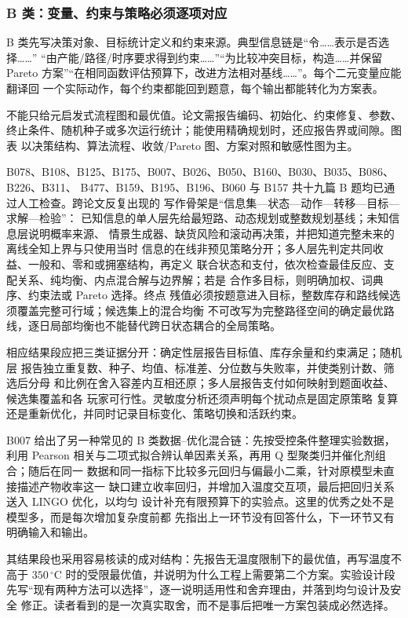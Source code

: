 \subsubsection{B 类：变量、约束与策略必须逐项对应}

B 类先写决策对象、目标统计定义和约束来源。典型信息链是“令……表示是否选择……”
“由产能/路径/时序要求得到约束……”“为比较冲突目标，构造……并保留 Pareto
方案”“在相同函数评估预算下，改进方法相对基线……”。每个二元变量应能翻译回
一个实际动作，每个约束都能回到题意，每个输出都能转化为方案表。

不能只给元启发式流程图和最优值。论文需报告编码、初始化、约束修复、参数、
终止条件、随机种子或多次运行统计；能使用精确规划时，还应报告界或间隙。图表
以决策结构、算法流程、收敛/Pareto 图、方案对照和敏感性图为主。

B078、B108、B125、B175、B007、B026、B050、B160、B030、B035、B086、B226、B311、
B477、B159、B195、B196、B060 与 B157 共十九篇 B 题均已通过人工检查。跨论文反复出现的
写作骨架是“信息集—状态—动作—转移—目标—求解—检验”：
已知信息的单人层先给最短路、动态规划或整数规划基线；未知信息层说明概率来源、
情景生成器、缺货风险和滚动再决策，并把知道完整未来的离线全知上界与只使用当时
信息的在线非预见策略分开；多人层先判定共同收益、一般和、零和或拥塞结构，再定义
联合状态和支付，依次检查最佳反应、支配关系、纯均衡、内点混合解与边界解；若是
合作多目标，则明确加权、词典序、约束法或 Pareto 选择。终点
残值必须按题意进入目标，整数库存和路线候选须覆盖完整可行域；候选集上的混合均衡
不可改写为完整路径空间的确定最优路线，逐日局部均衡也不能替代跨日状态耦合的全局策略。

相应结果段应把三类证据分开：确定性层报告目标值、库存余量和约束满足；随机层
报告独立重复数、种子、均值、标准差、分位数与失败率，并使类别计数、筛选后分母
和比例在舍入容差内互相还原；多人层报告支付如何映射到题面收益、候选集覆盖和各
玩家可行性。灵敏度分析还须声明每个扰动点是固定原策略
复算还是重新优化，并同时记录目标变化、策略切换和活跃约束。

B007 给出了另一种常见的 B 类数据--优化混合链：先按受控条件整理实验数据，利用
Pearson 相关与二项式拟合辨认单因素关系，再用 Q 型聚类归并催化剂组合；随后在同一
数据和同一指标下比较多元回归与偏最小二乘，针对原模型未直接描述产物收率这一
缺口建立收率回归，并增加入温度交互项，最后把回归关系送入 LINGO 优化，以均匀
设计补充有限预算下的实验点。这里的优秀之处不是模型多，而是每次增加复杂度前都
先指出上一环节没有回答什么，下一环节又有明确输入和输出。

其结果段也采用容易核读的成对结构：先报告无温度限制下的最优值，再写温度不高于
$350\,^{\circ}\mathrm{C}$ 时的受限最优值，并说明为什么工程上需要第二个方案。实验设计段
先写“现有两种方法可以选择”，逐一说明适用性和舍弃理由，并落到均匀设计及安全
修正。读者看到的是一次真实取舍，而不是事后把唯一方案包装成必然选择。

